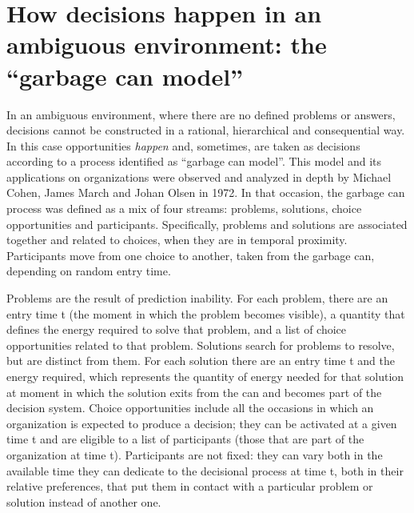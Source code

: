 \section{How decisions happen in an ambiguous environment: the ``garbage can model''}

In an ambiguous environment, where there are no defined problems or answers, decisions cannot be constructed in a rational, hierarchical and consequential way. In this case opportunities \textit{happen} and, sometimes, are taken as decisions according to a process identified as ``garbage can model''\cite{1, 2}. This model and its applications on organizations were observed and analyzed in depth by Michael Cohen, James March and Johan Olsen in 1972\cite{1}. In that occasion, the garbage can process was defined as a mix of four streams: problems, solutions, choice opportunities and participants. Specifically, problems and solutions are associated together and related to choices, when they are in temporal proximity\cite{2}. Participants move from one choice to another, taken from the garbage can, depending on random entry time.

Problems are the result of prediction inability. For each problem, there are an entry time t (the moment in which the problem becomes visible), a quantity that defines the energy required to solve that problem, and a list of choice opportunities related to that problem. Solutions search for problems to resolve, but are distinct from them. For each solution there are an entry time t and the energy required, which represents the quantity of energy needed for that solution at moment in which the solution exits from the can and becomes part of the decision system. Choice opportunities include all the occasions in which an organization is expected to produce a decision; they  can be activated at a given time t and are eligible to a list of participants (those that are part of the organization at time t). Participants are not fixed: they can vary both in the available time they can dedicate to the decisional process at time t, both in their relative preferences, that put them in contact with a particular problem or solution instead of another one\cite{1}.

